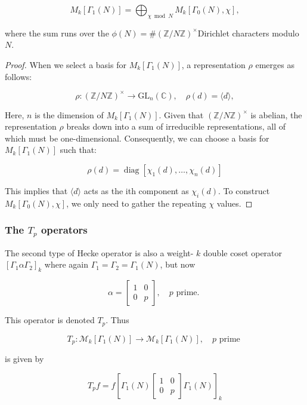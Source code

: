 \begin{proposition}
    $$
M_{k}\left[\Gamma_{1}(N)\right]=\bigoplus_{\chi \bmod N} M_{k}\left[\Gamma_{0}(N), \chi\right],
$$

where the sum runs over the $\phi(N)=\#(\mathbb{Z} / N \mathbb{Z})^{\times}$Dirichlet characters modulo $N$.
\end{proposition}
\begin{proof}
    When we select a basis for \( M_{k}\left[\Gamma_{1}(N)\right] \), a representation \( \rho \) emerges as follows:

\[
\rho:(\mathbb{Z} / N \mathbb{Z})^{\times} \to \mathrm{GL}_{n}(\mathbb{C}), \quad \rho(d)=\langle d\rangle,
\]

Here, \( n \) is the dimension of \( M_{k}\left[\Gamma_{1}(N)\right] \). Given that \( (\mathbb{Z} / N \mathbb{Z})^{\times} \) is abelian, the representation \( \rho \) breaks down into a sum of irreducible representations, all of which must be one-dimensional. Consequently, we can choose a basis for \( M_{k}\left[\Gamma_{1}(N)\right] \) such that:

\[
\rho(d) = \operatorname{diag}\left[\chi_{1}(d), \ldots, \chi_{n}(d)\right]
\]

This implies that \( \langle d \rangle \) acts as the ith component as \( \chi_{i}(d) \). To construct \( M_{k}\left[\Gamma_{0}(N), \chi\right] \), we only need to gather the repeating \( \chi \) values.
\end{proof}

\subsubsection{The $T_p$ operators}
\begin{definition}
    The second type of Hecke operator is also a weight- $k$ double coset operator $\left[\Gamma_{1} \alpha \Gamma_{2}\right]_{k}$ where again $\Gamma_{1}=\Gamma_{2}=\Gamma_{1}(N)$, but now

$$
\alpha=\left[\begin{array}{ll}
1 & 0 \\
0 & p
\end{array}\right], \quad p \text { prime. }
$$

This operator is denoted $T_{p}$. Thus

$$
T_{p}: \mathcal{M}_{k}\left[\Gamma_{1}(N)\right] \longrightarrow \mathcal{M}_{k}\left[\Gamma_{1}(N)\right], \quad p \text { prime }
$$

is given by

$$
T_{p} f=f\left[\Gamma_{1}(N)\left[\begin{array}{ll}
1 & 0 \\
0 & p
\end{array}\right] \Gamma_{1}(N)\right]_{k}
$$

\end{definition}

